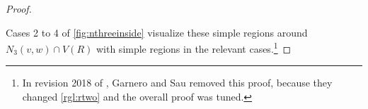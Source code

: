 \begin{proof}
\begin{enumerate}
    \end{enumerate}

    Cases 2 to 4 of \cref{fig:nthreeinside} visualize these simple regions around $N_3(v,w) \cap V(R)$ with simple regions in the relevant cases.\footnote{In revision 2018 of \cite{Garnero2018}, Garnero and Sau removed this proof, because they changed \cref{rgl:rtwo} and the overall proof was tuned.}
    
\end{proof}


